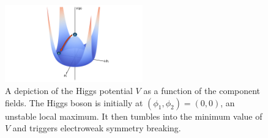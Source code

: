 \begin{figure}[htbp]
    \centering
    \includegraphics[width=0.53\textwidth]{./figures/higgs_potential_pptx.pdf}  %
    \caption[A depiction of the Higgs potential $V$ as a function of the component fields]{A depiction of the Higgs potential $V$ as a function of the component fields. The Higgs boson is initially at $(\phi_1, \phi_2) = (\text{0}, \text{0})$, an unstable local maximum. It then tumbles into the minimum value of $V$ and triggers electroweak symmetry breaking.}
    \label{fig:higgs_potential}
\end{figure}

